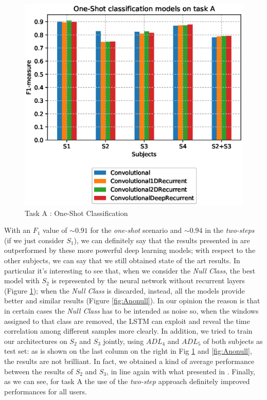 \begin{figure}[ht]
	\centering
	\includegraphics[scale=.4]{figure/A_models_nullclass}
	\caption{Task A : One-Shot Classification}
	\label{fig:Anull}
\end{figure}

With an $F_1$ value of $\sim 0.91$ for the \textit{one-shot} scenario and $\sim 0.94$ in the \textit{two-steps} (if we just consider $S_1$), we can definitely say that the results presented in \cite{Chavarriaga2013} are outperformed by these more powerful deep learning models; with respect to the other subjects, we can say that we still obtained state of the art results. In particular it's interesting to see that, when we consider the \textit{Null Class}, the best model with $S_2$ is represented by the neural network without recurrent layers (Figure \ref{fig:Anull}); when the \textit{Null Class} is discarded, instead, all the models provide better and similar results (Figure \ref{fig:Anonull}). In our opinion the reason is that in certain cases the \textit{Null Class} has to be intended as noise so, when the windows assigned to that class are removed, the LSTM can exploit and reveal the time correlation among different samples more clearly. In addition, we tried to train our architectures on $S_2$ and $S_3$ jointly, using $ADL_4$ and $ADL_5$ of both subjects as test set: as is shown on the last column on the right in Fig \ref{fig:Anull} and \ref{fig:Anonull}, the results are not brilliant. In fact, we obtained a kind of average performance between the results of $S_2$ and $S_3$, in line again with what presented in \cite{Chavarriaga2013}. Finally, as we can see, for task A the use of the \textit{two-step} approach definitely improved performances for all users. 

